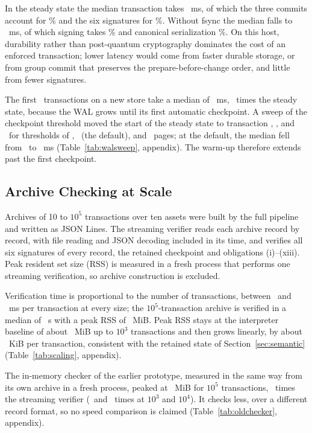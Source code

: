 \documentclass[journal]{IEEEtran}
\begin{document}
In the steady state the median transaction takes \TimDurTotal~ms, of which the three commits account for \TimDurSqlitePct\% and the six signatures for \TimDurSignPct\%. Without fsync the median falls to \TimNoTotal~ms, of which signing takes \TimNoSignPct\% and canonical serialization \TimNoCanonPct\%. On this host, durability rather than post-quantum cryptography dominates the cost of an enforced transaction; lower latency would come from faster durable storage, or from group commit that preserves the prepare-before-change order, and little from fewer signatures.

The first \TimColdStartN\ transactions on a new store take a median of \TimColdStart~ms, \TimColdRatio\ times the steady state, because the WAL grows until its first automatic checkpoint. A sweep of the checkpoint threshold moved the start of the steady state to transaction \WalSteadyA, \WalSteadyB, and \WalSteadyC\ for thresholds of \WalPagesA, \WalPagesB\ (the default), and \WalPagesC\ pages; at the default, the median fell from \WalBeforeB\ to \WalAfterB~ms (Table~\ref{tab:walsweep}, appendix). The warm-up therefore extends past the first checkpoint.

\subsection{Archive Checking at Scale}
\label{sec:scale}
Archives of 10 to $10^5$ transactions over ten assets were built by the full pipeline and written as JSON Lines. The streaming verifier reads each archive record by record, with file reading and JSON decoding included in its time, and verifies all six signatures of every record, the retained checkpoint and obligations (i)--(xiii). Peak resident set size (RSS) is measured in a fresh process that performs one streaming verification, so archive construction is excluded.

Verification time is proportional to the number of transactions, between \ScalHundredPerTx\ and \ScalThousandPerTx~ms per transaction at every size; the $10^5$-transaction archive is verified in a median of \ScalHundredKMedR~s with a peak RSS of \ScalHundredKRss~MiB. Peak RSS stays at the interpreter baseline of about \ScalThousandRss~MiB up to $10^3$ transactions and then grows linearly, by about \ScalKiBPerTx~KiB per transaction, consistent with the retained state of Section~\ref{sec:semantic} (Table~\ref{tab:scaling}, appendix).

The in-memory checker of the earlier prototype, measured in the same way from its own archive in a fresh process, peaked at \OldHundredKRss~MiB for $10^5$ transactions, \OldHundredKRatio\ times the streaming verifier (\OldThousandRatio\ and \OldTenKRatio\ times at $10^3$ and $10^4$). It checks less, over a different record format, so no speed comparison is claimed (Table~\ref{tab:oldchecker}, appendix).
\end{document}
